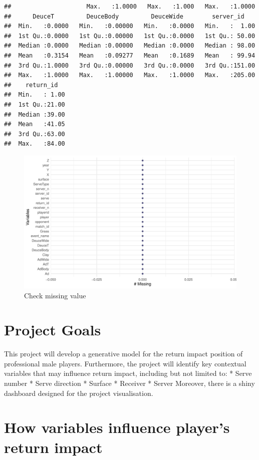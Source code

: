 \documentclass[11pt,a4paper,]{article}
\begin{document}
\begin{verbatim}
##                     Max.   :1.0000   Max.   :1.000   Max.   :1.0000  
##      DeuceT         DeuceBody         DeuceWide        server_id     
##  Min.   :0.0000   Min.   :0.00000   Min.   :0.0000   Min.   :  1.00  
##  1st Qu.:0.0000   1st Qu.:0.00000   1st Qu.:0.0000   1st Qu.: 50.00  
##  Median :0.0000   Median :0.00000   Median :0.0000   Median : 98.00  
##  Mean   :0.3154   Mean   :0.09277   Mean   :0.1689   Mean   : 99.94  
##  3rd Qu.:1.0000   3rd Qu.:0.00000   3rd Qu.:0.0000   3rd Qu.:151.00  
##  Max.   :1.0000   Max.   :1.00000   Max.   :1.0000   Max.   :205.00  
##    return_id    
##  Min.   : 1.00  
##  1st Qu.:21.00  
##  Median :39.00  
##  Mean   :41.05  
##  3rd Qu.:63.00  
##  Max.   :84.00
\end{verbatim}

\begin{figure}
\includegraphics[width=1\linewidth]{Report_files/figure-latex/tidymiss-1} \caption{Check missing value}\label{fig:tidymiss}
\end{figure}

\hypertarget{project-goals}{%
\section{Project Goals}\label{project-goals}}

This project will develop a generative model for the return impact position of professional male players. Furthermore, the project will identify key contextual variables that may influence return impact, including but not limited to:
* Serve number
* Serve direction
* Surface
* Receiver
* Server
Moreover, there is a shiny dashboard designed for the project visualisation.

\hypertarget{how-variables-influence-players-return-impact}{%
\section{How variables influence player's return impact}\label{how-variables-influence-players-return-impact}}
\end{document}
